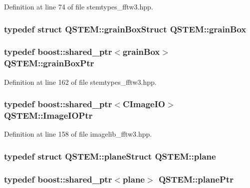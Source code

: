 Definition at line 74 of file stemtypes\-\_\-fftw3.\-hpp.

\hypertarget{namespace_q_s_t_e_m_afc13846814505527653b1f6a2377b926}{
\subsubsection[{grain\-Box}]{\setlength{\rightskip}{0pt plus 5cm}typedef struct {\bf Q\-S\-T\-E\-M\-::grain\-Box\-Struct}  {\bf Q\-S\-T\-E\-M\-::grain\-Box}}}\label{namespace_q_s_t_e_m_afc13846814505527653b1f6a2377b926}
\hypertarget{namespace_q_s_t_e_m_adf02490820ebdc3eb2b77754a5235eac}{
\subsubsection[{grain\-Box\-Ptr}]{\setlength{\rightskip}{0pt plus 5cm}typedef boost\-::shared\-\_\-ptr$<${\bf grain\-Box}$>$ {\bf Q\-S\-T\-E\-M\-::grain\-Box\-Ptr}}}\label{namespace_q_s_t_e_m_adf02490820ebdc3eb2b77754a5235eac}


Definition at line 162 of file stemtypes\-\_\-fftw3.\-hpp.

\hypertarget{namespace_q_s_t_e_m_a4983475ef18f1a1f4bbfaabb6d187b9a}{
\subsubsection[{Image\-I\-O\-Ptr}]{\setlength{\rightskip}{0pt plus 5cm}typedef boost\-::shared\-\_\-ptr$<${\bf C\-Image\-I\-O}$>$ {\bf Q\-S\-T\-E\-M\-::\-Image\-I\-O\-Ptr}}}\label{namespace_q_s_t_e_m_a4983475ef18f1a1f4bbfaabb6d187b9a}


Definition at line 158 of file imagelib\-\_\-fftw3.\-hpp.

\hypertarget{namespace_q_s_t_e_m_a3fcdd3743dc6202901c46d6c22f3fd1c}{
\subsubsection[{plane}]{\setlength{\rightskip}{0pt plus 5cm}typedef struct {\bf Q\-S\-T\-E\-M\-::plane\-Struct}  {\bf Q\-S\-T\-E\-M\-::plane}}}\label{namespace_q_s_t_e_m_a3fcdd3743dc6202901c46d6c22f3fd1c}
\hypertarget{namespace_q_s_t_e_m_ad1e29d7e576e38eb5e76380847534c9c}{
\subsubsection[{plane\-Ptr}]{\setlength{\rightskip}{0pt plus 5cm}typedef boost\-::shared\-\_\-ptr$<${\bf plane}$>$ {\bf Q\-S\-T\-E\-M\-::plane\-Ptr}}}\label{namespace_q_s_t_e_m_ad1e29d7e576e38eb5e76380847534c9c}


